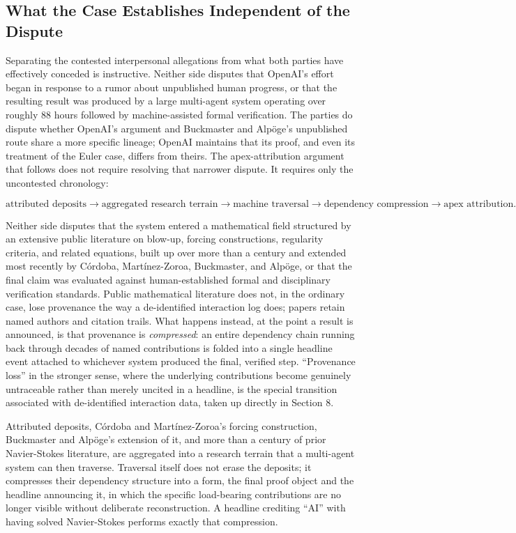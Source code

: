 \documentclass[11pt]{article}
\begin{document}
\subsection{What the Case Establishes Independent of the Dispute}

Separating the contested interpersonal allegations from what both parties have effectively conceded is instructive. Neither side disputes that OpenAI's effort began in response to a rumor about unpublished human progress, or that the resulting result was produced by a large multi-agent system operating over roughly 88 hours followed by machine-assisted formal verification. The parties do dispute whether OpenAI's argument and Buckmaster and Alp\"{o}ge's unpublished route share a more specific lineage; OpenAI maintains that its proof, and even its treatment of the Euler case, differs from theirs. The apex-attribution argument that follows does not require resolving that narrower dispute. It requires only the uncontested chronology:

\[
\text{attributed deposits}
\rightarrow
\text{aggregated research terrain}
\rightarrow
\text{machine traversal}
\rightarrow
\text{dependency compression}
\rightarrow
\text{apex attribution}.
\]

Neither side disputes that the system entered a mathematical field structured by an extensive public literature on blow-up, forcing constructions, regularity criteria, and related equations, built up over more than a century and extended most recently by C\'{o}rdoba, Mart\'{i}nez-Zoroa, Buckmaster, and Alp\"{o}ge, or that the final claim was evaluated against human-established formal and disciplinary verification standards. Public mathematical literature does not, in the ordinary case, lose provenance the way a de-identified interaction log does; papers retain named authors and citation trails. What happens instead, at the point a result is announced, is that provenance is \emph{compressed}: an entire dependency chain running back through decades of named contributions is folded into a single headline event attached to whichever system produced the final, verified step. ``Provenance loss'' in the stronger sense, where the underlying contributions become genuinely untraceable rather than merely uncited in a headline, is the special transition associated with de-identified interaction data, taken up directly in Section 8.

Attributed deposits, C\'{o}rdoba and Mart\'{i}nez-Zoroa's forcing construction, Buckmaster and Alp\"{o}ge's extension of it, and more than a century of prior Navier-Stokes literature, are aggregated into a research terrain that a multi-agent system can then traverse. Traversal itself does not erase the deposits; it compresses their dependency structure into a form, the final proof object and the headline announcing it, in which the specific load-bearing contributions are no longer visible without deliberate reconstruction. A headline crediting ``AI'' with having solved Navier-Stokes performs exactly that compression.
\end{document}
